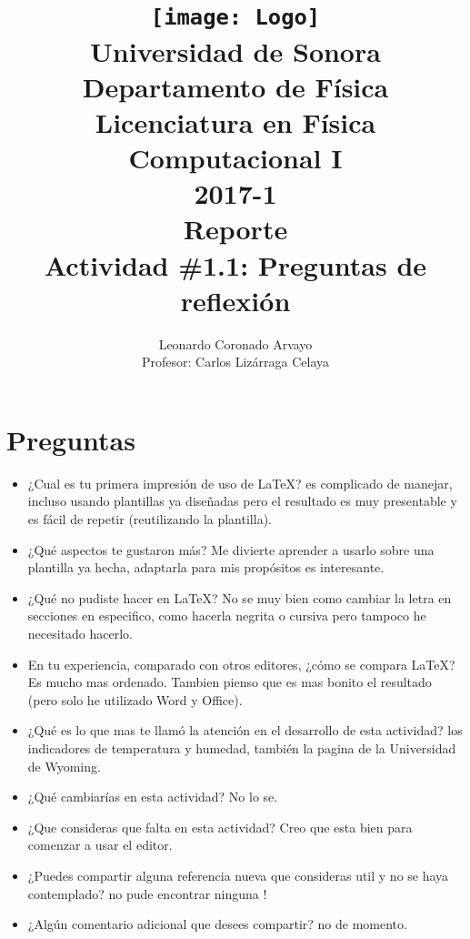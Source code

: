 \documentclass[12pt,letterpaper]{article}
\author{
Leonardo Coronado Arvayo\\
Profesor: Carlos Lizárraga Celaya   \vspace*{1.25in}}
\title{	\texttt{[image: Logo]} \\
Universidad de Sonora \\
{\small Departamento de Física \\
Licenciatura en Física \\
Computacional I \\
2017-1 \\
\vspace{0.55in} Reporte}\\ 
{\Huge Actividad \#1.1: Preguntas de reflexión}\\
\vspace*{1.0in}}
\begin{document}
	\maketitle
\newpage


\section{Preguntas}

\begin{itemize}
\item     ¿Cual es tu primera impresión de uso de LaTeX? es complicado de manejar, incluso usando plantillas ya diseñadas pero el resultado es muy presentable y es fácil de repetir (reutilizando la plantilla).
\item     ¿Qué aspectos te gustaron más? Me divierte aprender a usarlo sobre una plantilla ya hecha, adaptarla para mis propósitos es interesante. 
\item     ¿Qué no pudiste hacer en LaTeX? No se muy bien como cambiar la letra en secciones en especifico, como hacerla negrita o cursiva pero tampoco he necesitado hacerlo.
\item     En tu experiencia, comparado con otros editores, ¿cómo se compara LaTeX? Es mucho mas ordenado. Tambien pienso que es mas bonito el resultado (pero solo he utilizado Word y Office).
\item     ¿Qué es lo que mas te llamó la atención en el desarrollo de esta actividad? los indicadores de temperatura y humedad, también la pagina de la Universidad de Wyoming.
\item     ¿Qué cambiarías en esta actividad? No lo se.
\item     ¿Que consideras que falta en esta actividad? Creo que esta bien para comenzar a usar el editor. 
\item   ¿Puedes compartir alguna referencia nueva que consideras util y no se haya contemplado? no pude encontrar ninguna !
\item     ¿Algún comentario adicional que desees compartir? no de momento.
\end{itemize}
   
\end{document}
